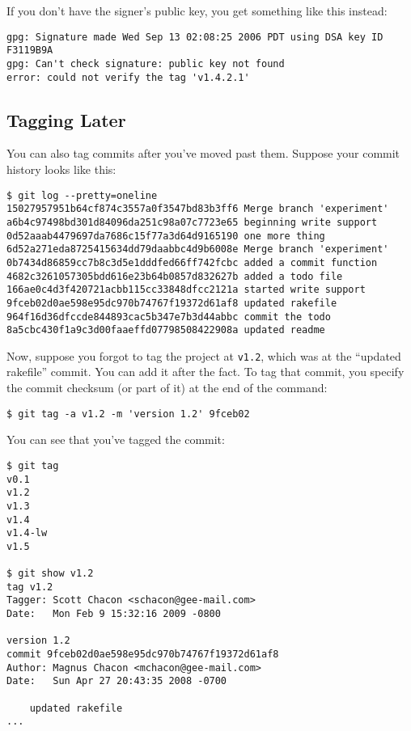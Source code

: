 \documentclass[a4paper]{book}
\begin{document}
If you don't have the signer's public key, you get something like this instead:

\begin{shaded}\begin{verbatim}
gpg: Signature made Wed Sep 13 02:08:25 2006 PDT using DSA key ID F3119B9A
gpg: Can't check signature: public key not found
error: could not verify the tag 'v1.4.2.1'
\end{verbatim}\end{shaded}

\subsection{Tagging Later}

You can also tag commits after you've moved past them. Suppose your commit history looks like this:

\begin{shaded}\begin{verbatim}
$ git log --pretty=oneline
15027957951b64cf874c3557a0f3547bd83b3ff6 Merge branch 'experiment'
a6b4c97498bd301d84096da251c98a07c7723e65 beginning write support
0d52aaab4479697da7686c15f77a3d64d9165190 one more thing
6d52a271eda8725415634dd79daabbc4d9b6008e Merge branch 'experiment'
0b7434d86859cc7b8c3d5e1dddfed66ff742fcbc added a commit function
4682c3261057305bdd616e23b64b0857d832627b added a todo file
166ae0c4d3f420721acbb115cc33848dfcc2121a started write support
9fceb02d0ae598e95dc970b74767f19372d61af8 updated rakefile
964f16d36dfccde844893cac5b347e7b3d44abbc commit the todo
8a5cbc430f1a9c3d00faaeffd07798508422908a updated readme
\end{verbatim}\end{shaded}

Now, suppose you forgot to tag the project at \texttt{v1.2}, which was at the “updated rakefile” commit. You can add it after the fact. To tag that commit, you specify the commit checksum (or part of it) at the end of the command:

\begin{shaded}\begin{verbatim}
$ git tag -a v1.2 -m 'version 1.2' 9fceb02
\end{verbatim}\end{shaded}

You can see that you've tagged the commit:

\begin{shaded}\begin{verbatim}
$ git tag
v0.1
v1.2
v1.3
v1.4
v1.4-lw
v1.5

$ git show v1.2
tag v1.2
Tagger: Scott Chacon <schacon@gee-mail.com>
Date:   Mon Feb 9 15:32:16 2009 -0800

version 1.2
commit 9fceb02d0ae598e95dc970b74767f19372d61af8
Author: Magnus Chacon <mchacon@gee-mail.com>
Date:   Sun Apr 27 20:43:35 2008 -0700

    updated rakefile
...
\end{verbatim}\end{shaded}
\end{document}
